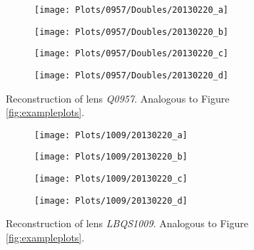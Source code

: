 \documentclass[10pt]{article}
\begin{document}
\begin{figure}[ht!]
 \centering
 \begin{subfigure}{.48\textwidth}
  \centering
  \texttt{[image: Plots/0957/Doubles/20130220\_a]}
  \caption{}
 \end{subfigure}
 \begin{subfigure}{.48\textwidth}
  \centering
  \texttt{[image: Plots/0957/Doubles/20130220\_b]}
  \caption{}
 \end{subfigure}
 
 \begin{subfigure}{.48\textwidth}
  \centering
  \texttt{[image: Plots/0957/Doubles/20130220\_c]}
  \caption{}
 \end{subfigure}
 \begin{subfigure}{.48\textwidth}
  \centering
  \texttt{[image: Plots/0957/Doubles/20130220\_d]}
  \caption{}
 \end{subfigure}
 \captionsetup{width=.93\textwidth}
 \caption{Reconstruction of lens \textit{Q0957}. Analogous to Figure \ref{fig:exampleplots}.}
 \label{fig:957}
\end{figure}

\begin{figure}[ht!]
 \centering
 \begin{subfigure}{.48\textwidth}
  \centering
  \texttt{[image: Plots/1009/20130220\_a]}
  \caption{}
 \end{subfigure}
 \begin{subfigure}{.48\textwidth}
  \centering
  \texttt{[image: Plots/1009/20130220\_b]}
  \caption{}
 \end{subfigure}
 
 \begin{subfigure}{.48\textwidth}
  \centering
  \texttt{[image: Plots/1009/20130220\_c]}
  \caption{}
 \end{subfigure}
 \begin{subfigure}{.48\textwidth}
  \centering
  \texttt{[image: Plots/1009/20130220\_d]}
  \caption{}
 \end{subfigure}
 \captionsetup{width=.93\textwidth}
 \caption{Reconstruction of lens \textit{LBQS1009}. Analogous to Figure \ref{fig:exampleplots}.}
 \label{fig:1009}
\end{figure}
\end{document}
